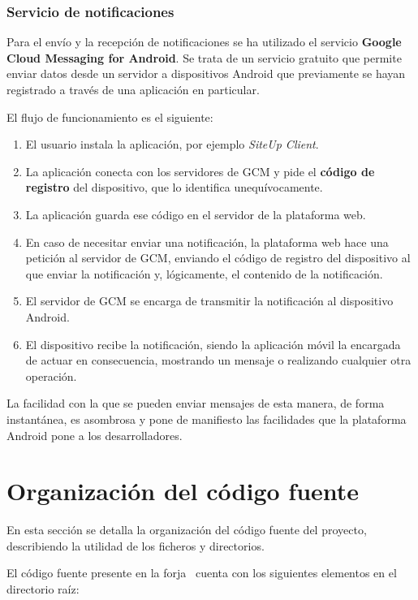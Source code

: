 \subsubsection{Servicio de notificaciones}

Para el envío y la recepción de notificaciones se ha utilizado el servicio
\textbf{Google Cloud Messaging for Android}. Se trata de un servicio gratuito
que permite enviar datos desde un servidor a dispositivos Android que
previamente se hayan registrado a través de una aplicación en particular.

El flujo de funcionamiento es el siguiente:
\begin{enumerate}
\item El usuario instala la aplicación, por ejemplo \textit{SiteUp Client}.
\item La aplicación conecta con los servidores de GCM y pide el \textbf{código
    de registro} del dispositivo, que lo identifica unequívocamente.
\item La aplicación guarda ese código en el servidor de la plataforma web.
\item En caso de necesitar enviar una notificación, la plataforma web hace una
  petición al servidor de GCM, enviando el código de registro del dispositivo al
  que enviar la notificación y, lógicamente, el contenido de la notificación.
\item El servidor de GCM se encarga de transmitir la notificación al dispositivo
  Android.
\item El dispositivo recibe la notificación, siendo la aplicación móvil la
  encargada de actuar en consecuencia, mostrando un mensaje o realizando
  cualquier otra operación.
\end{enumerate}

La facilidad con la que se pueden enviar mensajes de esta manera, de forma
instantánea, es asombrosa y pone de manifiesto las facilidades que la plataforma
Android pone a los desarrolladores.

\section{Organización del código fuente}

En esta sección se detalla la organización del código fuente del proyecto,
describiendo la utilidad de los ficheros y directorios.

El código fuente presente en la forja~\cite{forja} cuenta con los siguientes
elementos en el directorio raíz:

